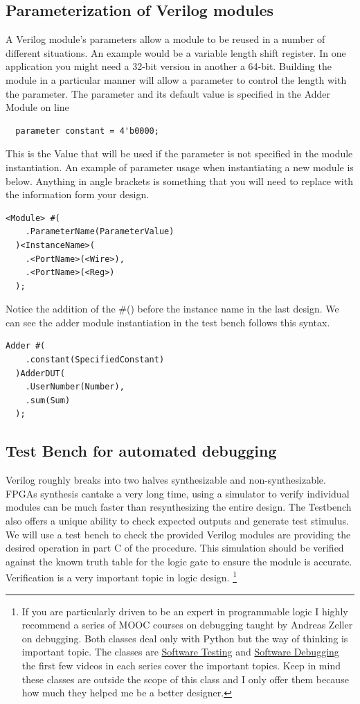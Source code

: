     \subsection{Parameterization of Verilog modules}
      A Verilog module's parameters allow a module to be reused in a number of different situations. An example would be a variable length shift register. In one application you might need a 32-bit version in another a 64-bit. Building the module in a particular manner will allow a parameter to control the length with the parameter. The parameter and its default value is specified in the Adder Module on line
      \begin{lstlisting}
  parameter constant = 4'b0000;
      \end{lstlisting}
      This is the Value that will be used if the parameter is not specified in the module instantiation. An example of parameter usage when instantiating a new module is below. Anything in angle brackets is something that you will need to replace with the information form your design.
    \begin{lstlisting}[caption={Module instantiation template with parameterization}]
  <Module> #(
    .ParameterName(ParameterValue)
  )<InstanceName>(
    .<PortName>(<Wire>),
    .<PortName>(<Reg>)
  );
    \end{lstlisting}
    Notice the addition of the \#() before the instance name in the last design. We can see the adder module instantiation in the test bench follows this syntax.
    \begin{lstlisting}[caption={Module instantiation from Adder test bench}]
  Adder #(
    .constant(SpecifiedConstant)
  )AdderDUT(
    .UserNumber(Number),
    .sum(Sum)
  );
    \end{lstlisting}

      \subsection{Test Bench for automated debugging}
      Verilog roughly breaks into two halves synthesizable and non-synthesizable. FPGAs synthesis cantake a very long time, using a simulator to verify individual modules can be much faster than resynthesizing the entire design. The Testbench also offers a unique ability to check expected outputs and generate test stimulus. We will use a test bench to check the provided Verilog modules are providing the desired operation in part C of the procedure. This simulation should be verified against the known truth table for the logic gate to ensure the module is accurate. Verification is a very important topic in logic design. \footnote{If you are particularly driven to be an expert in programmable logic I highly recommend a series of MOOC courses on debugging taught by Andreas Zeller on debugging. Both classes deal only with Python but the way of thinking is important topic. The classes are \href{https://www.udacity.com/course/cs258}{Software Testing} and \href{https://www.udacity.com/course/cs259}{Software Debugging} the first few videos in each series cover the important topics. Keep in mind these classes are outside the scope of this class and I only offer them because how much they helped me be a better designer.}

